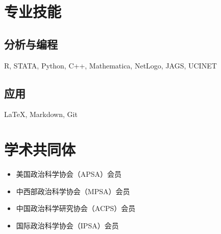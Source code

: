 \documentclass[11pt,a4paper,]{awesome-cv}
\providecommand{\tightlist}{%
	\setlength{\itemsep}{0pt}\setlength{\parskip}{0pt}}
\begin{document}
\begin{cventries}
    \vspace{-4.0mm}
    \vspace{-4.0mm}
    \vspace{-4.0mm}
    \vspace{-4.0mm}
\end{cventries}

\hypertarget{ux4e13ux4e1aux6280ux80fd}{%
\section{专业技能}\label{ux4e13ux4e1aux6280ux80fd}}

\hypertarget{ux5206ux6790ux4e0eux7f16ux7a0b}{%
\subsection{\texorpdfstring{\textbf{分析与编程}}{分析与编程}}\label{ux5206ux6790ux4e0eux7f16ux7a0b}}

R, STATA, Python, C++, Mathematica, NetLogo, JAGS, UCINET

\hypertarget{ux5e94ux7528}{%
\subsection{\texorpdfstring{\textbf{应用}}{应用}}\label{ux5e94ux7528}}

LaTeX, Markdown, Git

\hypertarget{ux5b66ux672fux5171ux540cux4f53}{%
\section{学术共同体}\label{ux5b66ux672fux5171ux540cux4f53}}

\begin{itemize}
\tightlist
\item
  美国政治科学协会（APSA）会员
\item
  中西部政治科学协会（MPSA）会员
\item
  中国政治科学研究协会（ACPS）会员
\item
  国际政治科学协会（IPSA）会员
\end{itemize}


\label{LastPage}~
\end{document}
